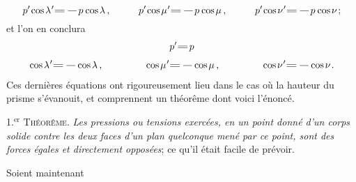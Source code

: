 \documentclass[11pt, twoside, leqno]{article}
\newcommand\equals{\scalebox{1.5}[1]{$=$}}
\newcommand\cosine{\operatorname{cos} \hspace{-0.1ex}}
\begin{document}
\begin{equation*}
p' \hspace{-0.2ex} \cosine \lambda\hspace{.1ex}' \equals \hspace{.3ex} \scalebox{1.5}[1]{$-$} \hspace{.1ex} p \hspace{.1ex} \cosine \lambda
\hspace{.4ex} \text{,}
\hspace{3em}
p' \hspace{-0.2ex} \cosine \mu\hspace{.1ex}' \equals \hspace{.3ex} \scalebox{1.5}[1]{$-$} \hspace{.1ex} p \hspace{.1ex} \cosine \mu
\hspace{.4ex} \text{,}
\hspace{3em}
p' \hspace{-0.2ex} \cosine \nu\hspace{.1ex}' \equals \hspace{.3ex} \scalebox{1.5}[1]{$-$} \hspace{.1ex} p \hspace{.1ex} \cosine \nu
\hspace{.3ex} \text{;}
\end{equation*}
et l'on en conclura\vspace{-0.5em}
\begin{equation*}\begin{gathered}
p' \equals \hspace{.2ex} p
\\[.4em]
%
\cosine \lambda\hspace{.1ex}' \equals \hspace{.3ex} \scalebox{1.5}[1]{$-$} \hspace{-0.1ex} \cosine \lambda
\hspace{.4ex} \text{,}
\hspace{4.4em}
\cosine \mu\hspace{.1ex}' \equals \hspace{.3ex} \scalebox{1.5}[1]{$-$} \hspace{-0.1ex} \cosine \mu
\hspace{.4ex} \text{,}
\hspace{4.4em}
\cosine \nu\hspace{.1ex}' \equals \hspace{.3ex} \scalebox{1.5}[1]{$-$} \hspace{-0.1ex} \cosine \nu
\hspace{.2ex} \text{.}
\end{gathered}\end{equation*}
Ces dernières équations ont rigoureusement lieu dans le cas où la hauteur du prisme s'évanouit, et comprennent un théorême dont voici l'énoncé.

1.${^{\text{er}}}$ \textsc{Théorême}. \emph{Les pressions ou tensions exercées, en un point donné d'un corps solide contre les deux faces d'un plan quelconque mené par ce point, sont des forces égales et directement opposées}\hspace{.2ex}; ce qu'il était facile de prévoir.

Soient maintenant
\end{document}
